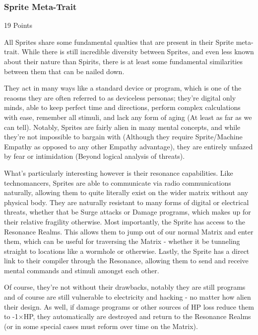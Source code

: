 \begin{multicols*}{3}
\subsubsection{Sprite Meta-Trait}
\begin{flushright}
	19 Points
\end{flushright}

All Sprites share some fundamental qualties that are present in their Sprite meta-trait. While there is still incredible diversity between Sprites, and even less known about their nature than Spirits, there is at least some fundamental similarities between them that can be nailed down.

They act in many ways like a standard device or program, which is one of the reaosns they are often referred to as deviceless personas; they're digital only minds, able to keep perfect time and directions, perform complex calculations with ease, remember all stimuli, and lack any form of aging (At least as far as we can tell). Notably, Sprites are fairly alien in many mental concepts, and while they're not impossible to bargain with (Although they require Sprite/Machine Empathy as opposed to any other Empathy advantage), they are entirely unfazed by fear or intimidation (Beyond logical analysis of threats).

What's particularly interesting however is their resonance capabilities. Like technomancers, Sprites are able to communicate via radio communications naturally, allowing them to quite literally exist on the wider matrix without any physical body. They are naturally resistant to many forms of digital or electrical threats, whether that be Surge attacks or Damage programs, which makes up for their relative fragility otherwise. Most importantly, the Sprite has access to the Resonance Realms. This allows them to jump out of our normal Matrix and enter them,  which can be useful for traversing the Matrix - whether it be tunneling straight to locations like a wormhole or otherwise. Lastly, the Sprite has a direct link to their compiler through the Resonance, allowing them to send and receive mental commands and stimuli amongst each other.

Of course, they're not without their drawbacks, notably they are still programs and of course are still vulnerable to electricity and hacking - no matter how alien their design. As well, if damage programs or other sources of HP loss reduce them to -1$\times$HP, they automatically are destroyed and return to the Resonance Realms (or in some special cases must reform over time on the Matrix).


\end{multicols*}
